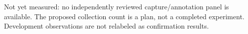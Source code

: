 Not yet measured: no independently reviewed capture/annotation panel is available. The proposed collection count is a plan, not a completed experiment. Development observations are not relabeled as confirmation results.
